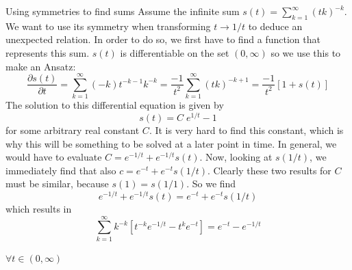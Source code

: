 \documentclass[11pt, xcolor=dvipsnames,aspectratio=169]{beamer}
\begin{document}
\begin{frame}{Using symmetries to find sums}
Assume the infinite sum $s(t) = \sum_{k=1}^{\infty} (tk)^{-k}$. We want to use its symmetry when transforming $t\rightarrow 1/t$ to deduce an unexpected relation. In order to do so, we first have to find a function that represents this sum. $s(t)$ is differentiable on the set $(0, \infty )$ so we use this to make an Ansatz:
\begin{equation}
\frac{\partial s(t)}{\partial t} = \sum_{k=1}^{\infty}(-k) t^{-k-1}  k^{-k} = \frac{-1}{t^2} \sum_{k=1}^{\infty} (tk)^{-k+1} = \frac{-1}{t^2}\left[ 1+s(t)\right]
\end{equation}
The solution to this differential equation is given by
\begin{equation}
    s(t) = C\;e^{1/t} - 1
\end{equation}
for some arbitrary real constant $C$. It is very hard to find this constant, which is why this will be something to be solved at a later point in time. In general, we would have to evaluate $C = e^{-1/t} + e^{-1/t} s(t)$.
Now, looking at $s(1/t)$, we immediately find that also $c = e^{-t} + e^{-t} s(1/t)$. Clearly these two results for $C$ must be similar, because $s(1) = s(1/1)$. So we find
\begin{equation}
    e^{-1/t} + e^{-1/t} s(t) = e^{-t} + e^{-t} s(1/t)
\end{equation}
which results in
\\
\begin{equation}
    \sum_{k=1}^{\infty} k^{-k} \left[ t^{-k}e^{-1/t} - t^ke^{-t}\right] = e^{-t} - e^{-1/t}
\end{equation}
\\
    $\forall t\in (0,\infty )$
    
\end{frame}
\end{document}
